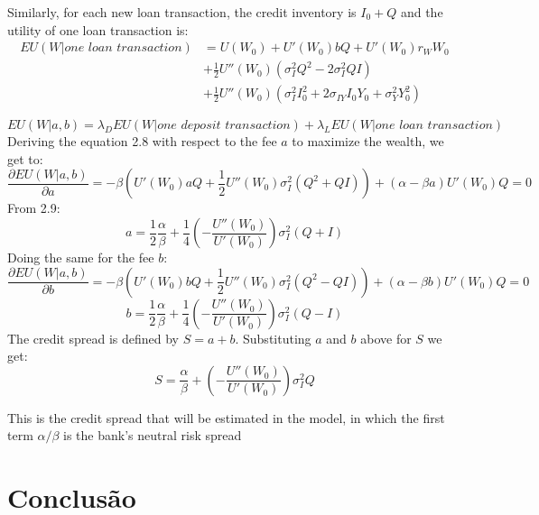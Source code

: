 Similarly, for each new loan transaction, the credit inventory is $I_0 + Q$ and the utility of one loan transaction is:
\begin{equation}
  \begin{aligned}
    EU(W|\textit{one loan transaction}) &= U(W_0) + U'(W_0)bQ +  U'(W_0)r_W W_0 \\ &+ \frac{1}{2}U''(W_0)(\sigma_I^2 Q^2 - 2\sigma_I^2 QI) \\ &+\frac{1}{2}U''(W_0)(\sigma_I^2 I_0^2 + 2\sigma_{IY} I_0 Y_0 + \sigma_Y^2 Y_0^2)
  \end{aligned}
\end{equation}

\begin{equation}
  EU(W|a,b) = \lambda_D EU(W|\textit{one deposit transaction}) + \lambda_L EU(W|\textit{one loan transaction})
\end{equation}
Deriving the equation 2.8 with respect to the fee $a$ to maximize the wealth, we get to:
\begin{equation}
  \frac{\partial EU(W|a,b)}{\partial a} = -\beta \left( U'(W_0)aQ +\frac{1}{2} U''(W_0)\sigma_I^2 (Q^2 + QI) \right) + (\alpha - \beta a) U'(W_0)Q = 0
\end{equation}
From 2.9:
\begin{equation}
  a = \frac{1}{2} \frac{\alpha}{\beta} + \frac{1}{4} \left(-\frac{U''(W_0)}{U'(W_0)}\right) \sigma_I^2(Q + I)
\end{equation}
Doing the same for the fee $b$:
\begin{equation}
  \frac{\partial EU(W|a,b)}{\partial b} = -\beta \left( U'(W_0)bQ +\frac{1}{2} U''(W_0)\sigma_I^2 (Q^2 - QI) \right) + (\alpha - \beta b) U'(W_0)Q = 0
\end{equation}
\begin{equation}
  b = \frac{1}{2} \frac{\alpha}{\beta} + \frac{1}{4} \left(-\frac{U''(W_0)}{U'(W_0)}\right) \sigma_I^2(Q - I)
\end{equation}
The credit spread is defined by $S=a+b$. Substituting $a$ and $b$ above for $S$ we get:
\begin{equation}
  S = \frac{\alpha}{\beta} + \left(-\frac{U''(W_0)}{U'(W_0)}\right) \sigma_I^2Q
\end{equation}

This is the credit spread that will be estimated in the model, in which the first term $\alpha/\beta$ is the bank's neutral risk spread



\chapter{Conclusão}

